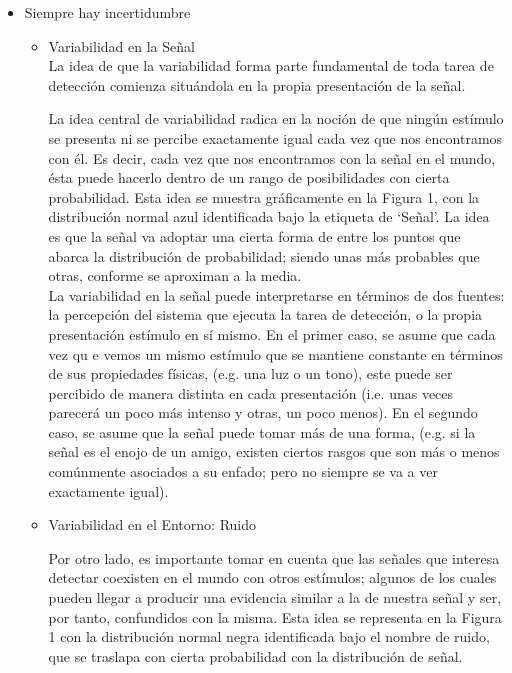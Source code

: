 \begin{itemize}
  \item{Siempre hay incertidumbre}


    \begin{itemize}
      \item{Variabilidad en la Señal}\\

%
La idea de que la variabilidad forma parte fundamental de toda tarea de detección comienza situándola en la propia presentación de la señal. 

La idea central de variabilidad radica en la noción de que ningún estímulo se presenta ni se percibe exactamente igual cada vez que nos encontramos con él.  Es decir, cada vez que nos encontramos con la  señal en el mundo, ésta puede hacerlo dentro de un rango de posibilidades con cierta probabilidad. Esta idea se muestra gráficamente en la Figura 1, con la distribución normal azul identificada bajo la etiqueta de ‘Señal’. La idea es que la señal va adoptar una cierta forma de entre los puntos que abarca la distribución de probabilidad; siendo unas más probables que otras, conforme se aproximan a la media.\\

La variabilidad en la señal puede interpretarse en términos de dos fuentes: la percepción del sistema que ejecuta la tarea de detección, o la propia presentación estímulo en sí mismo. En el primer caso, se asume que cada vez qu e vemos un mismo estímulo que se mantiene constante en términos de sus propiedades físicas,  (e.g. una luz o un tono),  este puede ser percibido de manera distinta en cada presentación (i.e. unas veces parecerá un poco más intenso y otras, un poco menos). En el segundo caso, se asume que la señal puede tomar más de una forma, (e.g. si la señal es el enojo de un amigo, existen ciertos rasgos que son más o menos comúnmente asociados a su enfado; pero no siempre se va a ver exactamente igual).\\

      \item{Variabilidad en el Entorno: Ruido}

Por otro lado, es importante tomar en cuenta que las señales que interesa detectar coexisten en el mundo con otros estímulos; algunos de los cuales pueden llegar a producir una evidencia similar a la de nuestra señal y ser, por tanto, confundidos con la misma. Esta idea se representa en la Figura 1 con la distribución normal negra identificada bajo el nombre de ruido, que se traslapa con cierta probabilidad con la distribución de señal.\\



\end{itemize}
\end{itemize}
